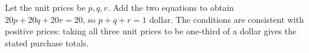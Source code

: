 Let the unit prices be $ p,q,r $. Add the two equations to obtain $ 20p+20q+20r=20 $, so $\boxed{p+q+r=1}$ dollar. The conditions are consistent with positive prices: taking all three unit prices to be one-third of a dollar gives the stated purchase totals.
